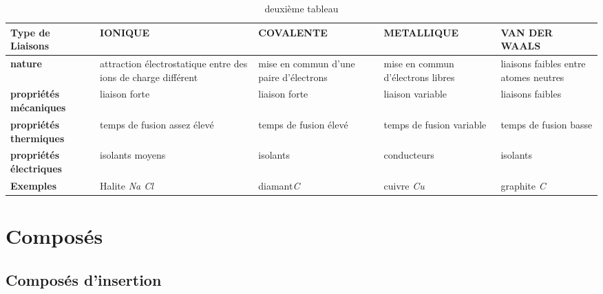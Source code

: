 \documentclass[a4 paper, 10 pt]{article}
\begin{document}
\begin{table}[h] 
\begin{tabular}{|p{2.5 cm}||p{2.5 cm}|p{2.5 cm}|p{2.5 cm}|p{2.5 cm}|} \hline
	\textbf{Type de Liaisons}  & IONIQUE & COVALENTE & METALLIQUE & VAN DER WAALS \\
	 \hline
	 \hline
	 
	\textbf{nature} & attraction électrostatique entre des ions de charge différent & mise  en  commun d’une paire d’électrons & mise  en  commun d’électrons libres & liaisons  faibles entre atomes neutres\\   \hline
	
	\textbf{propriétés mécaniques} & liaison forte & liaison forte & liaison variable & liaisons faibles\\  \hline
	
	\textbf{propriétés thermiques} & temps de fusion assez élevé & temps de fusion élevé & temps de fusion variable & temps de fusion basse\\  \hline
	
	\textbf{propriétés électriques} & isolants moyens & isolants & conducteurs & isolants\\  \hline
	
	\textbf{Exemples } & Halite \textit{Na Cl} & diamant\textit{C} & cuivre \textit{Cu} & graphite \textit{C} \\ \hline
	
\end{tabular}
	\caption{deuxième tableau}
\end{table}



\section{Composés}

\label{Composés}

\subsection{Composés d'insertion} 

\label{CompIns}
\end{document}
